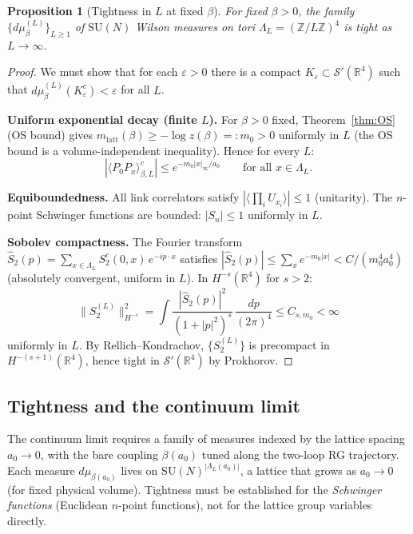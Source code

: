 \documentclass[11pt,a4paper]{amsart}
\newtheorem{proposition}[theorem]{Proposition}
\theoremstyle{definition}
\newcommand{\SU}{\mathrm{SU}}
\newcommand{\Z}{\mathbb{Z}}
\newcommand{\R}{\mathbb{R}}
\begin{document}
\begin{proposition}[Tightness in $L$ at fixed $\beta$]
\label{prop:infvol_tightness_fixed_beta}
For fixed $\beta > 0$, the family $\{d\mu_\beta^{(L)}\}_{L\ge 1}$ of
$\SU(N)$ Wilson measures on tori $\Lambda_L = (\Z/L\Z)^4$ is tight as $L\to\infty$.
\end{proposition}

\begin{proof}
We must show that for each $\varepsilon > 0$ there is a compact
$K_\varepsilon \subset \mathcal{S}'(\R^4)$ such that
$d\mu_\beta^{(L)}(K_\varepsilon^c) < \varepsilon$ for all $L$.

\textbf{Uniform exponential decay (finite $L$).}
For $\beta > 0$ fixed, Theorem~\ref{thm:OS} (OS bound) gives
$m_{\mathrm{latt}}(\beta) \ge -\log z(\beta) =: m_0 > 0$ uniformly in $L$
(the OS bound is a volume-independent inequality).  Hence for every $L$:
\[
  |\langle P_0 P_x\rangle_{\beta,L}^c| \le e^{-m_0|x|_\infty/a_0}
  \qquad\text{for all }x\in\Lambda_L.
\]

\textbf{Equiboundedness.}
All link correlators satisfy $|\langle \prod_i U_{x_i}\rangle| \le 1$ (unitarity).
The $n$-point Schwinger functions are bounded: $|S_n|\le 1$ uniformly in $L$.

\textbf{Sobolev compactness.}
The Fourier transform $\hat{S}_2(p) = \sum_{x\in\Lambda_L} S_2^c(0,x)\,e^{-ip\cdot x}$
satisfies $|\hat{S}_2(p)| \le \sum_x e^{-m_0|x|} < C/(m_0^4 a_0^4)$ (absolutely
convergent, uniform in $L$).  In $H^{-s}(\R^4)$ for $s>2$:
\[
  \|S_2^{(L)}\|_{H^{-s}}^2
  = \int \frac{|\hat{S}_2(p)|^2}{(1+|p|^2)^s}\,\frac{dp}{(2\pi)^4}
  \le C_{s,m_0} < \infty
\]
uniformly in $L$.  By Rellich--Kondrachov, $\{S_2^{(L)}\}$ is precompact
in $H^{-(s+1)}(\R^4)$, hence tight in $\mathcal{S}'(\R^4)$ by Prokhorov.
\end{proof}

\subsection{Tightness and the continuum limit}
\label{sec:tightness}

The continuum limit requires a family of measures indexed by the lattice
spacing $a_0\to 0$, with the bare coupling $\beta(a_0)$ tuned along the
two-loop RG trajectory.  Each measure $d\mu_{\beta(a_0)}$ lives on
$\SU(N)^{|\Lambda_L(a_0)|}$, a lattice that grows as $a_0\to 0$
(for fixed physical volume).  Tightness must be established for the
\emph{Schwinger functions} (Euclidean $n$-point functions), not for the
lattice group variables directly.
\end{document}
